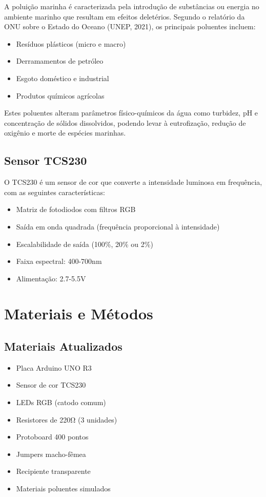 \documentclass[12pt]{article}
\begin{document}
A poluição marinha é caracterizada pela introdução de substâncias ou energia no ambiente marinho que resultam em efeitos deletérios. Segundo o relatório da ONU sobre o Estado do Oceano (UNEP, 2021), os principais poluentes incluem:

\begin{itemize}
    \item Resíduos plásticos (micro e macro)
    \item Derramamentos de petróleo
    \item Esgoto doméstico e industrial
    \item Produtos químicos agrícolas
\end{itemize}

Estes poluentes alteram parâmetros físico-químicos da água como turbidez, pH e concentração de sólidos dissolvidos, podendo levar à eutrofização, redução de oxigênio e morte de espécies marinhas.


\subsection{Sensor TCS230}
O TCS230 é um sensor de cor que converte a intensidade luminosa em frequência, com as seguintes características:

\begin{itemize}
    \item Matriz de fotodiodos com filtros RGB
    \item Saída em onda quadrada (frequência proporcional à intensidade)
    \item Escalabilidade de saída (100\%, 20\% ou 2\%)
    \item Faixa espectral: 400-700nm
    \item Alimentação: 2.7-5.5V
\end{itemize}


\section{Materiais e Métodos}

\subsection{Materiais Atualizados}
\begin{itemize}
    \item Placa Arduino UNO R3
    \item Sensor de cor TCS230
    \item LEDs RGB (catodo comum)
    \item Resistores de 220Ω (3 unidades)
    \item Protoboard 400 pontos
    \item Jumpers macho-fêmea
    \item Recipiente transparente
    \item Materiais poluentes simulados
\end{itemize}
\end{document}
